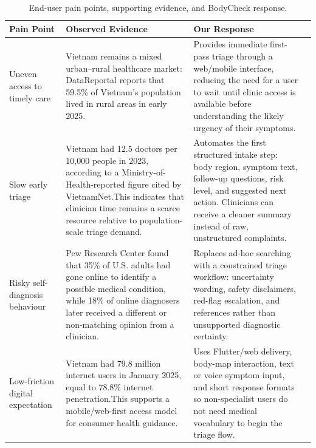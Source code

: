 \begin{table}[h!]
  \centering
  \caption{End-user pain points, supporting evidence, and BodyCheck response.}
  \label{tab:problem-fit-pain-points}
  \setlength{\tabcolsep}{5pt}
  \renewcommand{\arraystretch}{1.45}
  \small
  \begin{tabular}{@{} p{4cm} p{4.2cm} p{4.2cm} p{4cm} @{}}
    \toprule
    \textbf{Pain Point} &
    \textbf{Observed Evidence} &
    \textbf{Our Response}\\
    \midrule

    Uneven access to timely care &
    Vietnam remains a mixed urban--rural healthcare market: DataReportal
    reports that 59.5\% of Vietnam's population lived in rural areas in
    early 2025.\footnotemark[1] &
    Provides immediate first-pass triage through a web/mobile interface,
    reducing the need for a user to wait until clinic access is available
    before understanding the likely urgency of their symptoms. \\

    Slow early triage &
    Vietnam had 12.5 doctors per 10{,}000 people in 2023, according to a
    Ministry-of-Health-reported figure cited by VietnamNet.\footnotemark[2]
    This indicates that clinician time remains a scarce resource relative
    to population-scale triage demand. &
    Automates the first structured intake step: body region, symptom text,
    follow-up questions, risk level, and suggested next action. Clinicians
    can receive a cleaner summary instead of raw, unstructured complaints. \\

    Risky self-diagnosis behaviour &
    Pew Research Center found that 35\% of U.S. adults had gone online to
    identify a possible medical condition, while 18\% of online diagnosers
    later received a different or non-matching opinion from a clinician.
    \footnotemark[3] &
    Replaces ad-hoc searching with a constrained triage workflow:
    uncertainty wording, safety disclaimers, red-flag escalation, and
    references rather than unsupported diagnostic certainty. \\

    Low-friction digital expectation &
    Vietnam had 79.8 million internet users in January 2025, equal to
    78.8\% internet penetration.\footnotemark[1] This supports a
    mobile/web-first access model for consumer health guidance. &
    Uses Flutter/web delivery, body-map interaction, text or voice symptom
    input, and short response formats so non-specialist users do not need
    medical vocabulary to begin the triage flow. \\


\end{tabular}
\end{table}
